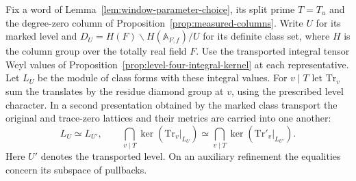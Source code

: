 \begin{auxlemma}
\label{lem:word-prescribed-class-lattice}
Fix a word of Lemma~\ref{lem:window-parameter-choice}, its split prime
\(T=T_u\) and the degree-zero column of
Proposition~\ref{prop:measured-columns}. Write \(U\) for its marked
level and \(D_U=H(F)\backslash H(\mathbb A_{F,f})/U\) for its
definite class set, where \(H\) is the column group over the totally
real field \(F\). Use the transported integral tensor Weyl values of
Proposition~\ref{prop:level-four-integral-kernel} at each representative.
Let \(L_U\) be the module of class forms with these integral values.
For \(v\mid T\) let \(\mathrm{Tr}_v\) sum the translates by the
residue diamond group at \(v\), using the prescribed level
character. In a second presentation obtained by the marked class
transport the original and trace-zero lattices and their metrics
are carried into one another:
\[
 L_U\simeq L_{U'},\qquad
 \bigcap_{v\mid T}\ker(\mathrm{Tr}_v|_{L_U})\simeq
 \bigcap_{v\mid T}\ker(\mathrm{Tr}'_v|_{L_{U'}}).
\]
Here \(U'\) denotes the transported level. On an auxiliary refinement
the equalities concern its subspace of pullbacks.
\end{auxlemma}
